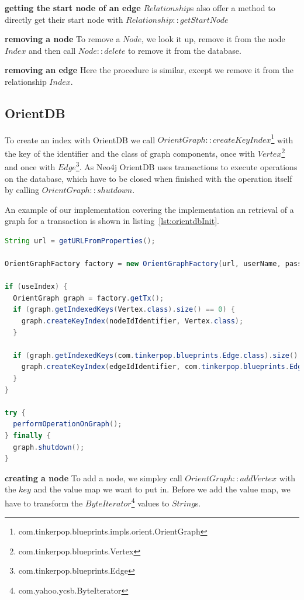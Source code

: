 \textbf{getting the start node of an edge} \newline
$ Relationship $s also offer a method to directly get their start node with $ Relationship::getStartNode $

\textbf{removing a node} \newline
To remove a $ Node $,
we look it up,
remove it from the node $ Index $ and then call $ Node::delete $ to remove it from the database.

\textbf{removing an edge} \newline
Here the procedure is similar,
except we remove it from the relationship $ Index $.

\subsection{OrientDB}
To create an index with OrientDB we call $ OrientGraph::createKeyIndex $\footnote{com.tinkerpop.blueprints.impls.orient.OrientGraph} with the key of the identifier and the class of graph components,
once with $ Vertex $\footnote{com.tinkerpop.blueprints.Vertex} and once with $ Edge $\footnote{com.tinkerpop.blueprints.Edge}.
As Neo4j OrientDB uses transactions to execute operations on the database,
which have to be closed when finished with the operation itself by calling $ OrientGraph::shutdown $.

An example of our implementation covering the implementation an retrieval of a graph for a transaction is shown in listing~\ref{lst:orientdbInit}.

\begin{lstlisting}[language=Java,label={lst:orientdbInit},caption={Implementation of the initialisation and the retrieval of a graph for a transaction.}]
String url = getURLFromProperties();

OrientGraphFactory factory = new OrientGraphFactory(url, userName, password);

if (useIndex) {
  OrientGraph graph = factory.getTx();
  if (graph.getIndexedKeys(Vertex.class).size() == 0) {
    graph.createKeyIndex(nodeIdIdentifier, Vertex.class);
  }

  if (graph.getIndexedKeys(com.tinkerpop.blueprints.Edge.class).size() == 0) {
    graph.createKeyIndex(edgeIdIdentifier, com.tinkerpop.blueprints.Edge.class);
  }
}

try {
  performOperationOnGraph();
} finally {
  graph.shutdown();
}
\end{lstlisting}

\textbf{creating a node} \newline
To add a node,
we simpley call $ OrientGraph::addVertex $ with the $ key $ and the value map we want to put in.
Before we add the value map,
we have to transform the $ ByteIterator $\footnote{com.yahoo.ycsb.ByteIterator} values to $ String $s.

